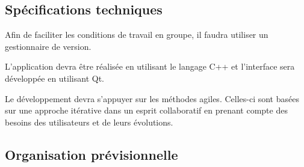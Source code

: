 \documentclass{report}
\begin{document}
\subsection{Spécifications techniques}

\hspace{0.5cm}Afin de faciliter les conditions de travail en groupe, il faudra utiliser un gestionnaire de version.\par
L'application devra être réalisée en utilisant le langage C++ et l'interface sera développée en utilisant Qt.\par
Le développement devra s'appuyer sur les méthodes agiles. Celles-ci sont basées sur une approche itérative dans un esprit collaboratif en prenant compte des besoins des utilisateurs et de leurs évolutions.\par

\subsection{Organisation prévisionnelle}
\end{document}
